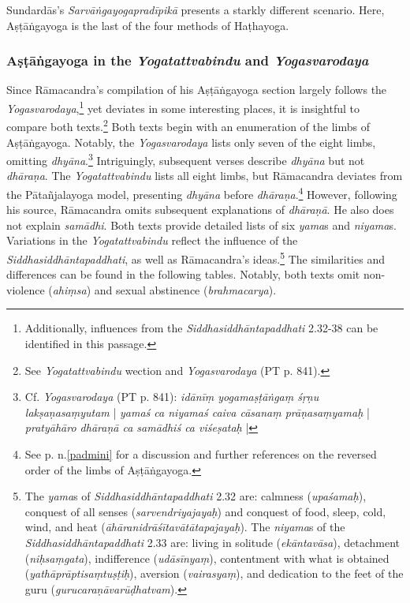 Sundardās's \textit{Sarvāṅgayogapradīpikā} presents a starkly different scenario. Here, Aṣṭāṅgayoga is the last of the four methods of Haṭhayoga.

\subsubsection{Aṣṭāṅgayoga in the \textit{Yogatattvabindu} and \textit{Yogasvarodaya}}
\label{ashtangayogax}
Since Rāmacandra's compilation of his Aṣṭāṅgayoga section largely follows the \textit{Yogasvarodaya},\footnote{Additionally, influences from the \emph{Siddhasiddhāntapaddhati} 2.32-38 can be identified in this passage.} yet deviates in some interesting places, it is insightful to compare both texts.\footnote{See \emph{Yogatattvabindu} wection  and \textit{Yogasvarodaya} (PT p. 841).}
Both texts begin with an enumeration of the limbs of Aṣṭāṅgayoga. Notably, the \emph{Yogasvarodaya} lists only seven of the eight limbs, omitting \textit{dhyāna}.\footnote{Cf. \textit{Yogasvarodaya} (PT p. 841): \textit{idānīṃ yogamaṣṭāṅgaṃ śṛṇu lakṣaṇasaṃyutam} | \textit{yamaś ca niyamaś caiva cāsanaṃ prāṇasaṃyamaḥ} | \textit{pratyāhāro dhāraṇā ca samādhiś ca viśeṣataḥ} |} Intriguingly, subsequent verses describe \textit{dhyāna} but not \textit{dhāraṇa}. The \textit{Yogatattvabindu} lists all eight limbs, but Rāmacandra deviates from the Pātañjalayoga model, presenting \textit{dhyāna} before \textit{dhāraṇa}.\footnote{See p.\pageref{padmini} n.\ref{padmini} for a discussion and further references on the reversed order of the limbs of Aṣṭāṅgayoga.} However, following his source, Rāmacandra omits subsequent explanations of \textit{dhāraṇā}. He also does not explain \emph{samādhi}.
Both texts provide detailed lists of six \textit{yama}s and \textit{niyama}s. Variations in the \textit{Yogatattvabindu} reflect the influence of the \emph{Siddhasiddhāntapaddhati}, as well as Rāmacandra's ideas.\footnote{The \textit{yama}s of \textit{Siddhasiddhāntapaddhati} 2.32 are: calmness (\textit{upaśamaḥ}), conquest of all senses (\textit{sarvendriyajayaḥ}) and conquest of food, sleep, cold, wind, and heat (\textit{āhāranidrāśītavātātapajayaḥ}). The \textit{niyama}s of the \textit{Siddhasiddhāntapaddhati} 2.33 are: living in solitude (\textit{ekāntavāsa}), detachment (\textit{niḥsaṃgata}), indifference (\textit{udāsīnyaṃ}), contentment with what is obtained (\textit{yathāprāptisaṃtuṣṭiḥ}), aversion (\textit{vairasyaṃ}), and dedication to the feet of the guru (\textit{gurucaraṇāvarūḍhatvam}).} The similarities and differences can be found in the following tables. Notably, both texts omit non-violence (\emph{ahiṃsa}) and sexual abstinence (\textit{brahmacarya}).

